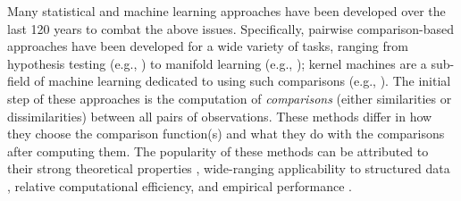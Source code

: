 \documentclass[11pt]{article}
\begin{document}
Many statistical and machine learning approaches have been developed over the last 120 years to combat the above issues. Specifically, pairwise comparison-based approaches have been developed for  a wide variety of tasks,  ranging from hypothesis testing (e.g., \cite{David1966,Mantel1967,Friedman1983,Schilling1986,Maa1996,SzekelyRizzo2009,SzekelyRizzo2013b,HellerGorfine2013,Dumcke2014}) 
to manifold learning (e.g., \cite{TorgersonBook, TenenbaumSilvaLangford2000, SaulRoweis2000, BelkinNiyogi2003,DiffusionPNAS, MMS:NoisyDictionaryLearning}); kernel machines are a sub-field of machine learning dedicated to using such comparisons (e.g., \cite{scholkopf2002learning,GrettonEtAl2005,harchaoui2013kernel}).
The initial step of these approaches is the computation of \emph{comparisons} (either  similarities or dissimilarities) between all pairs of observations.
These methods differ in how they choose the comparison function(s) and what they do with the comparisons after computing them. 
The popularity of these methods can be attributed to their strong theoretical properties \cite{SilvaTenenbaum2002,Allard2012}, wide-ranging applicability to structured data \cite{scholkopf2002learning}, relative computational efficiency, and empirical performance \cite{lu2014scale}.
% 
\end{document}
